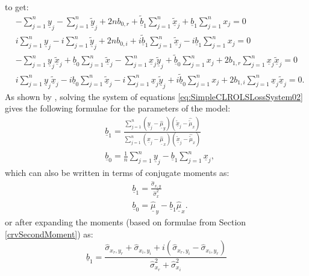 \documentclass[
]{book}
\begin{document}
to get:
\begin{equation}
    \begin{aligned}
        & - \sum_{j=1}^n \underline{y}_j - \sum_{j=1}^n \underline{\tilde{y}}_j + 2 n b_{0,r} + \underline{\tilde{b}}_1 \sum_{j=1}^n \underline{\tilde{x}}_j + \underline{b}_1 \sum_{j=1}^n {x}_j = 0 \\
        & i \sum_{j=1}^n \underline{y}_j - i \sum_{j=1}^n \underline{\tilde{y}}_j + 2 n b_{0,i} + i \underline{\tilde{b}}_1 \sum_{j=1}^n \underline{\tilde{x}}_j - i \underline{b}_1 \sum_{j=1}^n {x}_j = 0 \\
        & - \sum_{j=1}^n \underline{y}_j \underline{\tilde{x}}_j + \underline{b}_0 \sum_{j=1}^n \underline{\tilde{x}}_j - \sum_{j=1}^n \underline{x}_j \underline{\tilde{y}}_j + \underline{\tilde{b}}_0 \sum_{j=1}^n {x}_j + 2 b_{1,r} \sum_{j=1}^n \underline{x}_j \underline{\tilde{x}}_j = 0 \\
        & i \sum_{j=1}^n \underline{y}_j \underline{\tilde{x}}_j - i \underline{b}_0 \sum_{j=1}^n \underline{\tilde{x}}_j - i \sum_{j=1}^n \underline{x}_j \underline{\tilde{y}}_j + i \underline{\tilde{b}}_0 \sum_{j=1}^n {x}_j + 2 b_{1,i} \sum_{j=1}^n \underline{x}_j \underline{\tilde{x}}_j = 0 .
    \end{aligned}
    \label{eq:SimpleCLROLSLossSystem02}
\end{equation}
As shown by \citet{Svetunkov2012}, solving the system of equations \eqref{eq:SimpleCLROLSLossSystem02} gives the following formulae for the parameters of the model:
\begin{equation}
    \begin{aligned}
        & \underline{b}_1 = \frac{\sum_{j=1}^n (\underline{y}_j-\underline{\hat{\mu}}_{y}) (\underline{\tilde{x}}_j-\hat{\tilde{\mu}}_{x})}{\sum_{j=1}^n (\underline{x}_j-\underline{\hat{\mu}}_{x}) (\underline{\tilde{x}}_j-\hat{\tilde{\mu}}_{x})} \\
        & \underline{b}_0 = \frac{1}{n} \sum_{j=1}^n \underline{y}_j - \underline{b}_1 \sum_{j=1}^n \underline{x}_j ,
    \end{aligned}
    \label{eq:SimpleCLROLSLossParameters}
\end{equation}
which can also be written in terms of conjugate moments as:
\begin{equation}
    \begin{aligned}
        & \underline{b}_1 = \frac{\hat{\sigma}_{x,y}}{\hat{\sigma}_x^2} \\
        & \underline{b}_0 = \underline{\hat{\mu}}_{y} - \underline{b}_1 \underline{\hat{\mu}}_{x} .
    \end{aligned}
    \label{eq:SimpleCLROLSLossParametersMoments}
\end{equation}
or after expanding the moments (based on formulae from Section \ref{crvSecondMoment}) as:
\begin{equation}
        \underline{b}_1 = \frac{\hat{\sigma}_{x_r, y_r} + \hat{\sigma}_{x_i, y_i} + i (\hat{\sigma}_{x_r, y_i} - \hat{\sigma}_{x_i, y_r})}{\hat{\sigma}_{x_r}^2 + \hat{\sigma}_{x_i}^2}
    \label{eq:SimpleCLROLSLossParametersMomentsExpanded}
\end{equation}
\end{document}
